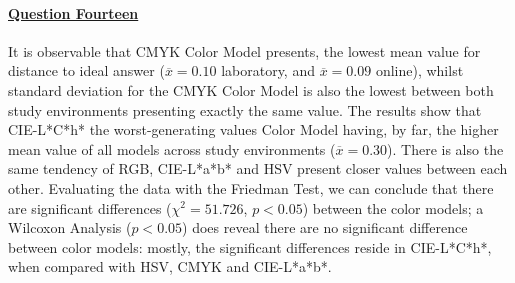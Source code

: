 \paragraph{\ul{Question Fourteen}}
%
It is observable that CMYK Color Model presents, the lowest mean value for distance to ideal answer ($\overline{x} = 0.10$ laboratory, and $\overline{x} = 0.09$ online), whilst standard deviation for the CMYK Color Model is also the
lowest between both study environments presenting exactly the same value.
The results show that CIE-L*C*h* the worst-generating values Color Model having, by far, the higher mean value of all models across study environments ($\overline{x} = 0.30$). There is also the same tendency of RGB,
CIE-L*a*b* and HSV present closer values between each other. Evaluating the data with the Friedman Test, we can conclude that there are significant differences ($\chi^2 = 51.726$, $p < 0.05$)
between the color models; a Wilcoxon Analysis ($p < 0.05$) does reveal there are no significant difference between color models: mostly, the significant differences reside in CIE-L*C*h*, when
compared with HSV, CMYK and CIE-L*a*b*. \par
%
